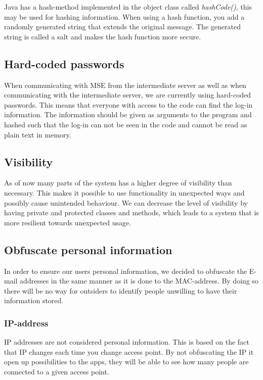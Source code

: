 Java has a hash-method implemented in the object class called \textit{hashCode()}, this may be used for hashing information. When using a hash function, you add a randomly generated string that extends the original message. The generated string is called a salt and makes the hash function more secure.

\subsection*{Hard-coded passwords}
When communicating with MSE from the intermediate server as well as when communicating with the intermediate server, we are currently using hard-coded passwords. This means that everyone with access to the code can find the log-in information. The information should be given as arguments to the program and hashed such that the log-in can not be seen in the code and cannot be read as plain text in memory. 

\subsection*{Visibility}
As of now many parts of the system has a higher degree of visibility than necessary. This makes it possible to use functionality in unexpected ways and possibly cause unintended behaviour. We can decrease the level of visibility by having private and protected classes and methods, which leads to a system that is more resilient towards unexpected usage.
 
\subsection*{Obfuscate personal information}
In order to ensure our users personal information, we decided to obfuscate the E-mail addresses in the same manner as it is done to the MAC-address. By doing so there will be no way for outsiders to identify people unwilling to have their information stored.

\subsubsection*{IP-address}
IP addresses are not considered personal information. This is based on the fact that IP changes each time you change access point. By not obfuscating the IP it open up possibilities to the apps, they will be able to see how many people are connected to a given access point. 